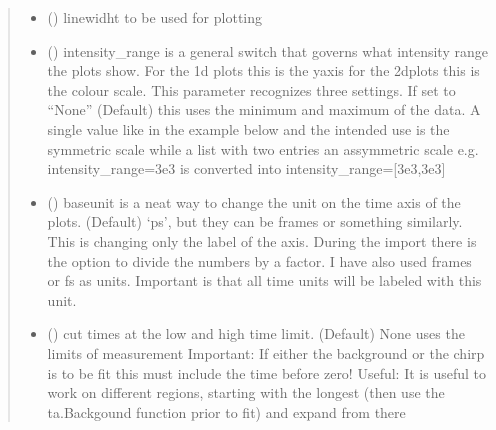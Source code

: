 \documentclass[letterpaper,10pt,english]{sphinxmanual}
\begin{document}
\begin{fulllineitems}
\begin{quote}
\begin{description}
\begin{itemize}
\item {} 
 (\sphinxstyleliteralemphasis{\sphinxupquote{, }}) \textendash{} linewidht to be used for plotting

\item {} 
 (\sphinxstyleliteralemphasis{\sphinxupquote{, }}\sphinxstyleliteralemphasis{\sphinxupquote{ {[}}}\sphinxstyleliteralemphasis{\sphinxupquote{{]}}}) \textendash{} intensity\_range is a general switch that governs what intensity range the plots show.
For the 1d plots this is the y\sphinxhyphen{}axis for the 2d\sphinxhyphen{}plots this is the colour scale.
This parameter recognizes three settings. If set to “None” (Default) this uses the minimum and
maximum of the data. A single value like in the example below and the intended use is the symmetric
scale while a list with two entries an assymmetric scale e.g.
intensity\_range=3e\sphinxhyphen{}3 is converted into intensity\_range={[}\sphinxhyphen{}3e\sphinxhyphen{}3,3e\sphinxhyphen{}3{]}

\item {} 
 () \textendash{} baseunit is a neat way to change the unit on the time axis of the plots. (Default) ‘ps’, but they
can be frames or something similarly. This is changing only the label of the axis.
During the import there is the option to divide the numbers by a factor.
I have also used frames or fs as units. Important is that all time units will be labeled with
this unit.

\item {} 
 (\sphinxstyleliteralemphasis{\sphinxupquote{ (}}\sphinxstyleliteralemphasis{\sphinxupquote{)}}\sphinxstyleliteralemphasis{\sphinxupquote{, }}) \textendash{} cut times at the low and high time limit. (Default) None uses the limits of measurement
Important: If either the background or the chirp is to be fit this must include the
time before zero! Useful: It is useful to work on different regions, starting with
the longest (then use the ta.Backgound function prior to fit) and expand from there


\end{itemize}
\end{description}
\end{quote}
\end{fulllineitems}
\end{document}
